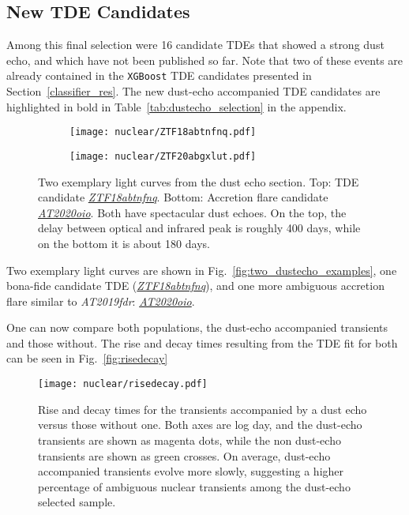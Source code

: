 \subsection{New TDE Candidates}

Among this final selection were 16 candidate TDEs that showed a strong dust echo, and which have not been published so far. Note that two of these events are already contained in the \texttt{XGBoost} TDE candidates presented in Section~\ref{classifier_res}. The new dust-echo accompanied TDE candidates are highlighted in bold in Table~\ref{tab:dustecho_selection} in the appendix.

\begin{figure}[h!]
  \centering
  \begin{subfigure}[htb]{1\textwidth}
    \centering
    \texttt{[image: nuclear/ZTF18abtnfnq.pdf]}
  \end{subfigure}
  \begin{subfigure}[htb]{1\textwidth}
    \centering
    \texttt{[image: nuclear/ZTF20abgxlut.pdf]}
  \end{subfigure}
  \caption[Two exemplary light curves from the dust echo selection]{Two exemplary light curves from the dust echo section. Top: TDE candidate \textit{\href{https://ztfnuclear.simeonreusch.com/transient/ZTF18abtnfnq}{ZTF18abtnfnq}}. Bottom: Accretion flare candidate \textit{\href{https://ztfnuclear.simeonreusch.com/transient/ZTF18abtnfnq}{AT2020oio}}. Both have spectacular dust echoes. On the top, the delay between optical and infrared peak is roughly 400 days, while on the bottom it is about 180 days.}
\end{figure}

Two exemplary light curves are shown in Fig.~\ref{fig:two_dustecho_examples}, one bona-fide candidate TDE (\textit{\href{https://ztfnuclear.simeonreusch.com/transient/ZTF18abtnfnq}{ZTF18abtnfnq}}), and one more ambiguous accretion flare similar to \textit{AT2019fdr}: \textit{\href{https://ztfnuclear.simeonreusch.com/transient/ZTF18abtnfnq}{AT2020oio}}.

One can now compare both populations, the dust-echo accompanied transients and those without. The rise and decay times resulting from the TDE fit for both can be seen in Fig.~\ref{fig:risedecay}

\begin{figure}[htb]
  \texttt{[image: nuclear/risedecay.pdf]}
  \caption[Dust and non-dust echo rise- and decay times]{Rise and decay times for the transients accompanied by a dust echo versus those without one. Both axes are log day, and the dust-echo transients are shown as magenta dots, while the non dust-echo transients are shown as green crosses. On average, dust-echo accompanied transients evolve more slowly, suggesting a higher percentage of ambiguous nuclear transients among the dust-echo selected sample.}
\end{figure}

